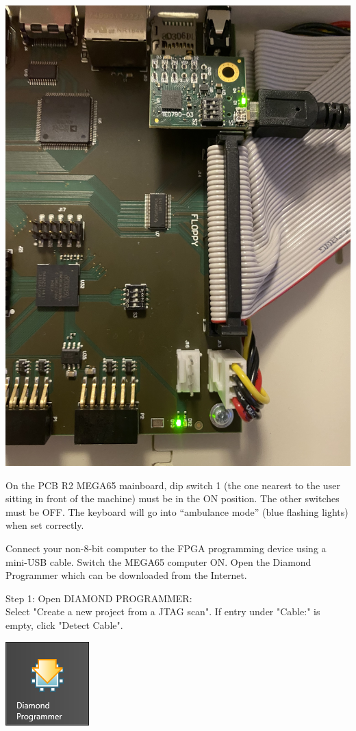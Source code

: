 \includegraphics[width=\linewidth]{images/jtag_detail_05.jpg}


On the PCB R2 MEGA65 mainboard, dip switch 1 (the one nearest to the user
sitting in front of the machine) must be in the ON position. The other
switches must be OFF. The keyboard will go into ``ambulance mode''
(blue flashing lights) when set correctly.

Connect your non-8-bit computer to the FPGA programming device using a
mini-USB cable. Switch the MEGA65 computer ON. Open the Diamond Programmer
which can be downloaded from the Internet.

\begin{minipage}{\linewidth}
Step 1: Open DIAMOND PROGRAMMER: \\
Select "Create a new project from a JTAG scan". If entry
under "Cable:" is empty, click "Detect Cable".
\\
  \begin{center}
  \includegraphics{images/diamond01.png}
  \end{center}
\end{minipage}

